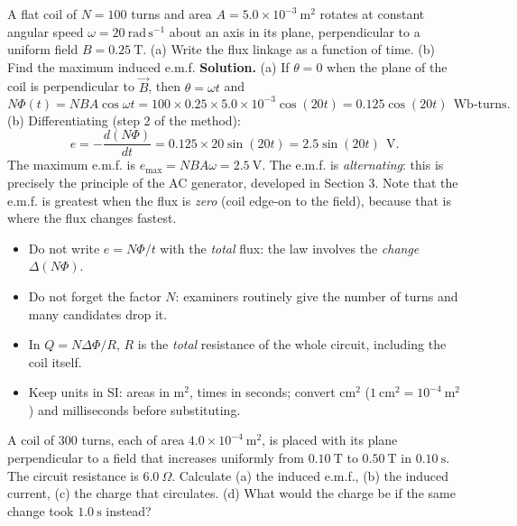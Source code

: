 \documentclass[11pt]{article}
\begin{document}
\begin{exoresolu}
A flat coil of $N = 100$ turns and area $A = 5.0\times10^{-3}\ \mathrm{m^{2}}$ rotates at constant angular speed $\omega = 20\ \mathrm{rad\,s^{-1}}$ about an axis in its plane, perpendicular to a uniform field $B = 0.25\ \mathrm{T}$. (a) Write the flux linkage as a function of time. (b) Find the maximum induced e.m.f.
\tcblower
\textbf{Solution.} (a) If $\theta = 0$ when the plane of the coil is perpendicular to $\vec{B}$, then $\theta = \omega t$ and
\[
N\Phi(t) = NBA\cos\omega t = 100 \times 0.25 \times 5.0\times10^{-3}\cos(20t) = 0.125\cos(20t)\ \ \mathrm{Wb\text{-}turns}.
\]
(b) Differentiating (step 2 of the method):
\[
e = -\frac{d(N\Phi)}{dt} = 0.125 \times 20 \sin(20t) = 2.5\sin(20t)\ \ \mathrm{V}.
\]
The maximum e.m.f. is $e_{\max} = NBA\omega = 2.5\ \mathrm{V}$. The e.m.f. is \emph{alternating}: this is precisely the principle of the AC generator, developed in Section 3. Note that the e.m.f. is greatest when the flux is \emph{zero} (coil edge-on to the field), because that is where the flux changes fastest.
\end{exoresolu}

\begin{attention}
\begin{itemize}
\item Do not write $e = N\Phi/t$ with the \emph{total} flux: the law involves the \emph{change} $\Delta(N\Phi)$.
\item Do not forget the factor $N$: examiners routinely give the number of turns and many candidates drop it.
\item In $Q = N\Delta\Phi/R$, $R$ is the \emph{total} resistance of the whole circuit, including the coil itself.
\item Keep units in SI: areas in $\mathrm{m^{2}}$, times in seconds; convert $\mathrm{cm^{2}}$ ($1\ \mathrm{cm^{2}} = 10^{-4}\ \mathrm{m^{2}}$) and milliseconds before substituting.
\end{itemize}
\end{attention}

\begin{exercice}[]
A coil of $300$ turns, each of area $4.0\times10^{-4}\ \mathrm{m^{2}}$, is placed with its plane perpendicular to a field that increases uniformly from $0.10\ \mathrm{T}$ to $0.50\ \mathrm{T}$ in $0.10\ \mathrm{s}$. The circuit resistance is $6.0\ \Omega$. Calculate (a) the induced e.m.f., (b) the induced current, (c) the charge that circulates. (d) What would the charge be if the same change took $1.0\ \mathrm{s}$ instead?
\end{exercice}
\end{document}
